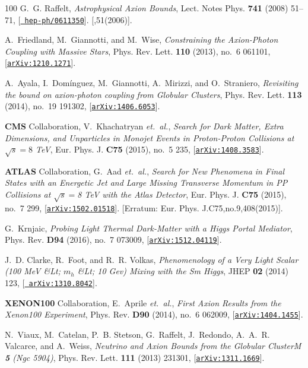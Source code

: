 \documentclass[11pt]{article}
\renewcommand{\[}{\begin{equation}}
\renewcommand{\]}{\end{equation}}
\begin{document}
\begin{thebibliography}{100}
G.~G. Raffelt, {\it {Astrophysical Axion Bounds}},  Lect. Notes Phys. {\bf 741}
  (2008) 51--71, [\href{http://xxx.lanl.gov/abs/hep-ph/0611350}{{\tt
  hep-ph/0611350}}]. [,51(2006)].

A.~Friedland, M.~Giannotti, and M.~Wise, {\it {Constraining the Axion-Photon
  Coupling with Massive Stars}},  Phys. Rev. Lett. {\bf 110} (2013), no.~6
  061101, [\href{http://xxx.lanl.gov/abs/1210.1271}{{\tt arXiv:1210.1271}}].

A.~Ayala, I.~Dom\'inguez, M.~Giannotti, A.~Mirizzi, and O.~Straniero, {\it
  {Revisiting the bound on axion-photon coupling from Globular Clusters}},
  Phys. Rev. Lett. {\bf 113} (2014), no.~19 191302,
  [\href{http://xxx.lanl.gov/abs/1406.6053}{{\tt arXiv:1406.6053}}].

{\bf CMS} Collaboration, V.~Khachatryan {\em et.~al.}, {\it {Search for Dark
  Matter, Extra Dimensions, and Unparticles in Monojet Events in Proton-Proton
  Collisions at $\sqrt{s} = 8$ TeV}},  Eur. Phys. J. {\bf C75} (2015), no.~5
  235, [\href{http://xxx.lanl.gov/abs/1408.3583}{{\tt arXiv:1408.3583}}].

{\bf ATLAS} Collaboration, G.~Aad {\em et.~al.}, {\it {Search for New Phenomena
  in Final States with an Energetic Jet and Large Missing Transverse Momentum
  in PP Collisions at $\sqrt{s}=$8 TeV with the Atlas Detector}},  Eur. Phys.
  J. {\bf C75} (2015), no.~7 299,
  [\href{http://xxx.lanl.gov/abs/1502.01518}{{\tt arXiv:1502.01518}}].
  [Erratum: Eur. Phys. J.C75,no.9,408(2015)].

G.~Krnjaic, {\it {Probing Light Thermal Dark-Matter with a Higgs Portal
  Mediator}},  Phys. Rev. {\bf D94} (2016), no.~7 073009,
  [\href{http://xxx.lanl.gov/abs/1512.04119}{{\tt arXiv:1512.04119}}].

J.~D. Clarke, R.~Foot, and R.~R. Volkas, {\it {Phenomenology of a Very Light
  Scalar (100 MeV \&Lt; $m_h$ \&Lt; 10 Gev) Mixing with the Sm Higgs}},  JHEP
  {\bf 02} (2014) 123, [\href{http://xxx.lanl.gov/abs/1310.8042}{{\tt
  arXiv:1310.8042}}].

{\bf XENON100} Collaboration, E.~Aprile {\em et.~al.}, {\it {First Axion
  Results from the Xenon100 Experiment}},  Phys. Rev. {\bf D90} (2014), no.~6
  062009, [\href{http://xxx.lanl.gov/abs/1404.1455}{{\tt arXiv:1404.1455}}].

N.~Viaux, M.~Catelan, P.~B. Stetson, G.~Raffelt, J.~Redondo, A.~A.~R. Valcarce,
  and A.~Weiss, {\it {Neutrino and Axion Bounds from the Globular ClusterM
  \textbf{5} (Ngc 5904)}},  Phys. Rev. Lett. {\bf 111} (2013) 231301,
  [\href{http://xxx.lanl.gov/abs/1311.1669}{{\tt arXiv:1311.1669}}].


\end{thebibliography}
\end{document}

